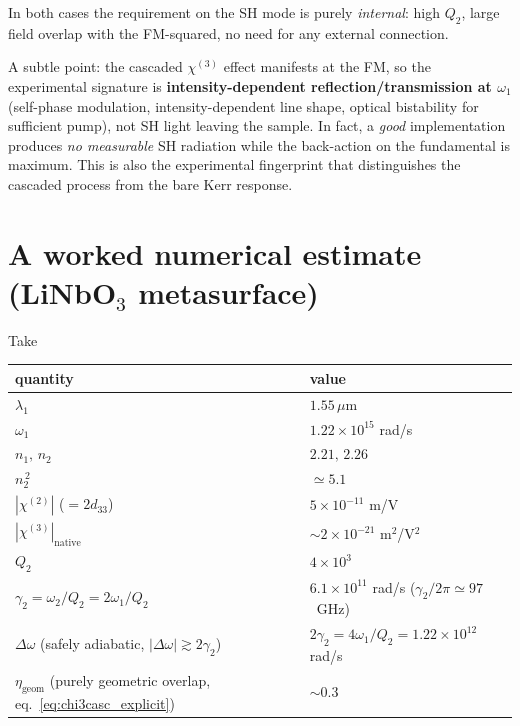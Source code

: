 \documentclass[11pt,a4paper]{article}
\newcommand{\chitwo}{\chi^{(2)}}
\newcommand{\chithree}{\chi^{(3)}}
\newcommand{\Dom}{\Delta\omega}
\begin{document}
In both cases the requirement on the SH mode is purely \emph{internal}:
high $Q_2$, large field overlap with the FM-squared, no need for any
external connection.

A subtle point: the cascaded $\chithree$ effect manifests at the FM, so
the experimental signature is \textbf{intensity-dependent
reflection/transmission at $\omega_1$} (self-phase modulation,
intensity-dependent line shape, optical bistability for sufficient pump),
not SH light leaving the sample.  In fact, a \emph{good} implementation
produces \emph{no measurable} SH radiation while the back-action on the
fundamental is maximum.  This is also the experimental fingerprint that
distinguishes the cascaded process from the bare Kerr response.

\section{A worked numerical estimate (LiNbO$_3$ metasurface)}\label{sec:numerical}

Take

\begin{center}
\begin{tabular}{ll}
\toprule
quantity & value \\
\midrule
$\lambda_1$               & $1.55\,\mu$m \\
$\omega_1$                & $1.22\times10^{15}$ rad/s \\
$n_1,\,n_2$               & $2.21,\,2.26$ \\
$n_2^{\,2}$               & $\simeq 5.1$ \\
$|\chitwo|$ ($=2d_{33}$)  & $5\times10^{-11}$ m/V \\
$|\chithree|_\text{native}$ & $\sim 2\times10^{-21}$ m$^2$/V$^2$ \\
$Q_2$                     & $4\times10^{3}$ \\
$\gamma_2=\omega_2/Q_2=2\omega_1/Q_2$ & $6.1\times10^{11}$ rad/s
                                       ($\gamma_2/2\pi\simeq 97$~GHz) \\
$\Dom$ (safely adiabatic, $|\Dom|\gtrsim 2\gamma_2$) &
   $2\gamma_2 = 4\omega_1/Q_2 = 1.22\times10^{12}$ rad/s \\
$\eta_\text{geom}$ (purely geometric overlap, eq.~\eqref{eq:chi3casc_explicit})
                          & $\sim 0.3$ \\
\bottomrule
\end{tabular}
\end{center}
\end{document}
